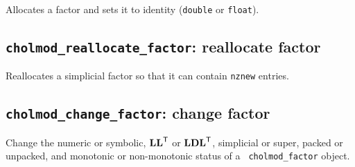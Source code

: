 \documentclass[11pt]{article}
\newcommand{\m}[1]{{\bf{#1}}}       %
\newcommand{\tr}{^{\sf T}}          %
\begin{document}

Allocates a factor and sets it to identity
({\tt double} or {\tt float}).

\subsection{{\tt cholmod\_reallocate\_factor}: reallocate factor}


Reallocates a simplicial factor so that it can contain {\tt nznew} entries.

\subsection{{\tt cholmod\_change\_factor}: change factor}


Change the numeric or symbolic, $\m{LL}\tr$ or $\m{LDL}\tr$, simplicial or
super, packed or unpacked, and monotonic or non-monotonic status of a {\tt
cholmod\_factor} object.
\end{document}

